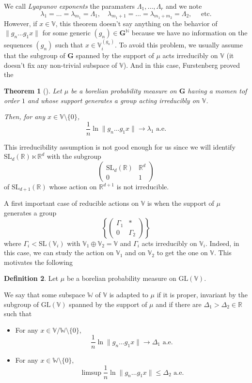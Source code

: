 \documentclass[11pt]{amsart}
\newtheorem{theorem}{Theorem}[section]
\theoremstyle{definition}
\newtheorem{definition}[theorem]{Definition}
\theoremstyle{remark}
\numberwithin{equation}{section}
\begin{document}
We call \emph{Lyapunov exponents} the paramaters $\Lambda_1, \dots ,\Lambda_r$ and we note
\[
\lambda_1 = \dots = \lambda_{m_1} = \Lambda_1, \quad \lambda_{m_1+1} = \dots = \lambda_{m_1+m_2} = \Lambda_2, \quad\text{ etc.}
\]
However, if $x\in {\mathbb V}$, this theorem doesn't say anything on the behavior of $\|g_n \dots g_1 x\|$ for some generic $(g_n)\in {\mathbf G}^{\mathbb N}$ because we have no information on the sequences $(g_n)$ such that $x\in {\mathbb V}_i^{(g_n)}$. To avoid this problem, we usually assume that the subgroup of ${\mathbf G}$ spanned by the support of $\mu$ acts irreducibly on ${\mathbb V}$ (it doesn't fix any non-trivial subspace of ${\mathbb V}$). And in this case, Furstenberg proved the
\begin{theorem}[\cite{BL85}]
Let $\mu$ be a borelian probability measure on ${\mathbf G}$ having a momen tof order $1$ and whose support generates a group acting irreducibly on ${\mathbb V}$.

Then, for any $x\in {\mathbb V}\setminus\{0\}$,
\[
\frac 1 n \ln \|g_n \dots g_1 x\| \xrightarrow\, \lambda_1 \text{ a.e.}
\]
\end{theorem}

This irreducibility assumption is not good enough for us since we will identify $\mathrm{SL}_d({\mathbb R}) \ltimes {\mathbb R}^d$ with the subgroup
\[
\left(\begin{array}{cc}
\mathrm{SL}_d({\mathbb R}) & {\mathbb R}^d \\ 0 & 1 
\end{array} \right)
\] 
of $\mathrm{SL}_{d+1}({\mathbb R})$ whose action on ${\mathbb R}^{d+1}$ is not irreducible.

\medskip
A first important case of reducible actions on ${\mathbb V}$ is when the support of $\mu$ generates a group
\[
\left\{ \left( \begin{array}{cc}
\Gamma_1 & \ast \\ 0 & \Gamma_2
\end{array}\right)\right\}
\]
where $\Gamma_i < \mathrm{SL}({\mathbb V}_i)$ with ${\mathbb V}_1 \oplus {\mathbb V}_2 = {\mathbb V}$ and $\Gamma_i$ acts irreducibly on ${\mathbb V}_i$. Indeed, in this case, we can study the action on ${\mathbb V}_1$ and on ${\mathbb V}_2$ to get the one on ${\mathbb V}$. This motivates the following

\begin{definition}
Let $\mu$ be a borelian probability measure on $\mathrm{GL}({\mathbb V})$.

We say that some subspace ${\mathbb W}$ of ${\mathbb V}$ is adapted to $\mu$ if it is proper, invariant by the subgroup of $\mathrm{GL}({\mathbb V})$ spanned by the support of $\mu$ and if there are $\Delta_1>\Delta_2 \in {\mathbb R}$ such that
\begin{itemize}
\item For any $x\in {\mathbb V}/{\mathbb W} \setminus\{0\}$,
\[
\frac 1 n \ln\|g_n \dots g_1 x\| \xrightarrow\, \Delta_1\text{ a.e.}
\]
\item For any $x\in {\mathbb W} \setminus\{0\}$,
\[
\limsup\frac 1 n \ln\|g_n \dots g_1 x\| \leqslant \Delta_2\text{ a.e.}
\]
\end{itemize}
\end{definition}
\end{document}
